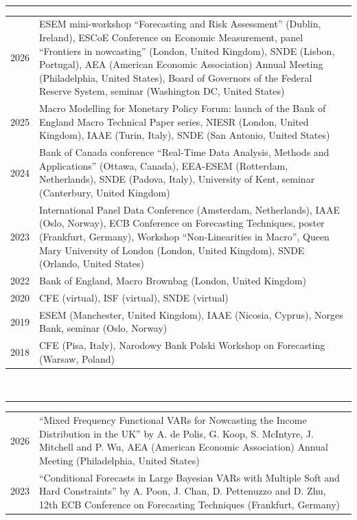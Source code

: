 \documentclass[11pt,a4paper]{article}
\makeatletter
\newcommand{\cvsection}[1]{\vspace{10pt}{\small\bfseries #1}\\[-7pt]\rule{\linewidth}{0.6pt}\vspace{2pt}}
\newenvironment{cvtable}{\small\begin{longtable}{@{}p{3.3cm}p{\dimexpr\linewidth-3.3cm-2\tabcolsep\relax}@{}}}{\end{longtable}\vspace{-14pt}}
\makeatother
\begin{document}
\cvsection{Presentations}
\begin{cvtable}
2026 & ESEM mini-workshop ``Forecasting and Risk Assessment'' (Dublin, Ireland), ESCoE Conference on Economic Measurement, panel ``Frontiers in nowcasting'' (London, United Kingdom), SNDE (Lisbon, Portugal), AEA (American Economic Association) Annual Meeting (Philadelphia, United States), Board of Governors of the Federal Reserve System, seminar (Washington DC, United States) \\
2025 & Macro Modelling for Monetary Policy Forum: launch of the Bank of England Macro Technical Paper series, NIESR (London, United Kingdom), IAAE (Turin, Italy), SNDE (San Antonio, United States) \\
2024 & Bank of Canada conference ``Real-Time Data Analysis, Methods and Applications'' (Ottawa, Canada), EEA-ESEM (Rotterdam, Netherlands), SNDE (Padova, Italy), University of Kent, seminar (Canterbury, United Kingdom) \\
2023 & International Panel Data Conference (Amsterdam, Netherlands), IAAE (Oslo, Norway), ECB Conference on Forecasting Techniques, poster (Frankfurt, Germany), Workshop ``Non-Linearities in Macro'', Queen Mary University of London (London, United Kingdom), SNDE (Orlando, United States) \\
2022 & Bank of England, Macro Brownbag (London, United Kingdom) \\
2020 & CFE (virtual), ISF (virtual), SNDE (virtual) \\
2019 & ESEM (Manchester, United Kingdom), IAAE (Nicosia, Cyprus), Norges Bank, seminar (Oslo, Norway) \\
2018 & CFE (Pisa, Italy), Narodowy Bank Polski Workshop on Forecasting (Warsaw, Poland) \\
\end{cvtable}

\cvsection{Discussions}
\begin{cvtable}
2026 & ``Mixed Frequency Functional VARs for Nowcasting the Income Distribution in the UK'' by A. de Polis, G. Koop, S. McIntyre, J. Mitchell and P. Wu, AEA (American Economic Association) Annual Meeting (Philadelphia, United States) \\
2023 & ``Conditional Forecasts in Large Bayesian VARs with Multiple Soft and Hard Constraints'' by A. Poon, J. Chan, D. Pettenuzzo and D. Zhu, 12th ECB Conference on Forecasting Techniques (Frankfurt, Germany) \\
\end{cvtable}
\end{document}
